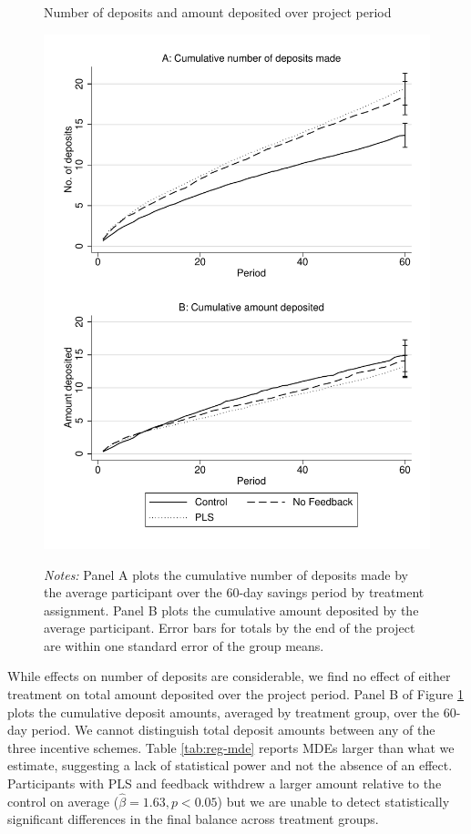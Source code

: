 \documentclass[11pt]{article}
\begin{document}
		\begin{figure}[ht]
			\caption{Number of deposits and amount deposited over project period}
			\includegraphics[height=0.85\textheight]{../../figures/line-cumdeposits.pdf}
			\label{fig:line-cumdeposits}
			\caption*{\footnotesize \emph{Notes:} Panel A plots the cumulative number of deposits made by the average participant over the 60-day savings period by treatment assignment. Panel B plots the cumulative amount deposited by the average participant. Error bars for totals by the end of the project are within one standard error of the group means.}
		\end{figure}

		\clearpage

		While effects on number of deposits are considerable, we find no effect of either treatment on total amount deposited over the project period. Panel B of Figure \ref{fig:line-cumdeposits} plots the cumulative deposit amounts, averaged by treatment group, over the 60-day period. We cannot distinguish total deposit amounts between any of the three incentive schemes. Table \ref{tab:reg-mde} reports MDEs larger than what we estimate, suggesting a lack of statistical power and not the absence of an effect. Participants with PLS and feedback withdrew a larger amount relative to the control on average ($\hat \beta = 1.63, p < 0.05$) but we are unable to detect statistically significant differences in the final balance across treatment groups.
\end{document}
